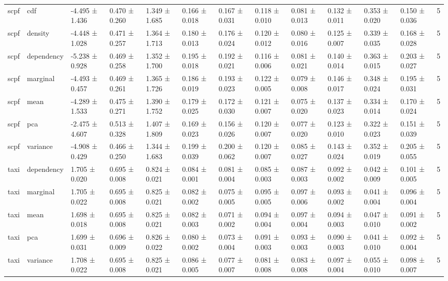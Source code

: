 \begin{table}
\begin{tabular}{llllllllllllr}
scpf & cdf & -4.495 ± 1.436 & 0.470 ± 0.260 & 1.349 ± 1.685 & 0.166 ± 0.018 & 0.167 ± 0.031 & 0.118 ± 0.010 & 0.081 ± 0.013 & 0.132 ± 0.011 & 0.353 ± 0.020 & 0.150 ± 0.036 & 5 \\
scpf & density & -4.448 ± 1.028 & 0.471 ± 0.257 & 1.364 ± 1.713 & 0.180 ± 0.013 & 0.176 ± 0.024 & 0.120 ± 0.012 & 0.080 ± 0.016 & 0.125 ± 0.007 & 0.339 ± 0.035 & 0.168 ± 0.028 & 5 \\
scpf & dependency & -5.238 ± 0.928 & 0.469 ± 0.258 & 1.352 ± 1.700 & 0.195 ± 0.018 & 0.192 ± 0.021 & 0.116 ± 0.006 & 0.081 ± 0.021 & 0.140 ± 0.014 & 0.363 ± 0.015 & 0.203 ± 0.027 & 5 \\
scpf & marginal & -4.493 ± 0.457 & 0.469 ± 0.261 & 1.365 ± 1.726 & 0.186 ± 0.019 & 0.193 ± 0.023 & 0.122 ± 0.005 & 0.079 ± 0.008 & 0.146 ± 0.017 & 0.348 ± 0.024 & 0.195 ± 0.031 & 5 \\
scpf & mean & -4.289 ± 1.533 & 0.475 ± 0.271 & 1.390 ± 1.752 & 0.179 ± 0.025 & 0.172 ± 0.030 & 0.121 ± 0.007 & 0.075 ± 0.020 & 0.137 ± 0.023 & 0.334 ± 0.014 & 0.170 ± 0.024 & 5 \\
scpf & pca & -2.475 ± 4.607 & 0.513 ± 0.328 & 1.407 ± 1.809 & 0.169 ± 0.023 & 0.156 ± 0.026 & 0.120 ± 0.007 & 0.077 ± 0.020 & 0.123 ± 0.010 & 0.322 ± 0.023 & 0.151 ± 0.039 & 5 \\
scpf & variance & -4.908 ± 0.429 & 0.466 ± 0.250 & 1.344 ± 1.683 & 0.199 ± 0.039 & 0.200 ± 0.062 & 0.120 ± 0.007 & 0.085 ± 0.027 & 0.143 ± 0.024 & 0.352 ± 0.019 & 0.205 ± 0.055 & 5 \\
taxi & dependency & 1.705 ± 0.020 & 0.695 ± 0.008 & 0.824 ± 0.021 & 0.084 ± 0.001 & 0.081 ± 0.004 & 0.085 ± 0.003 & 0.087 ± 0.003 & 0.092 ± 0.002 & 0.042 ± 0.009 & 0.101 ± 0.005 & 5 \\
taxi & marginal & 1.705 ± 0.022 & 0.695 ± 0.008 & 0.825 ± 0.021 & 0.082 ± 0.002 & 0.075 ± 0.005 & 0.095 ± 0.005 & 0.097 ± 0.006 & 0.093 ± 0.002 & 0.041 ± 0.004 & 0.096 ± 0.004 & 5 \\
taxi & mean & 1.698 ± 0.018 & 0.695 ± 0.008 & 0.825 ± 0.021 & 0.082 ± 0.003 & 0.071 ± 0.002 & 0.094 ± 0.004 & 0.097 ± 0.004 & 0.094 ± 0.003 & 0.047 ± 0.010 & 0.091 ± 0.002 & 5 \\
taxi & pca & 1.699 ± 0.031 & 0.696 ± 0.009 & 0.826 ± 0.022 & 0.080 ± 0.002 & 0.073 ± 0.004 & 0.091 ± 0.003 & 0.093 ± 0.003 & 0.090 ± 0.003 & 0.041 ± 0.010 & 0.092 ± 0.004 & 5 \\
taxi & variance & 1.708 ± 0.022 & 0.695 ± 0.008 & 0.825 ± 0.021 & 0.086 ± 0.005 & 0.077 ± 0.007 & 0.081 ± 0.008 & 0.083 ± 0.008 & 0.097 ± 0.004 & 0.055 ± 0.010 & 0.098 ± 0.007 & 5 \\

\end{tabular}
\end{table}

